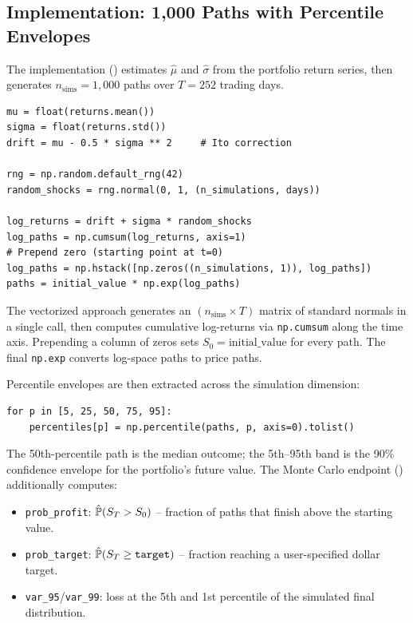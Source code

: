 \subsection{Implementation: 1,000 Paths with Percentile Envelopes}

The implementation () estimates $\hat{\mu}$ and $\hat{\sigma}$ from the portfolio return series, then generates $n_{\text{sims}} = 1{,}000$ paths over $T = 252$ trading days.

\begin{lstlisting}[style=python, caption={GBM vectorized simulation -- \filepath{portfolio\_engine.py} lines 304--319}]
mu = float(returns.mean())
sigma = float(returns.std())
drift = mu - 0.5 * sigma ** 2     # Ito correction

rng = np.random.default_rng(42)
random_shocks = rng.normal(0, 1, (n_simulations, days))

log_returns = drift + sigma * random_shocks
log_paths = np.cumsum(log_returns, axis=1)
# Prepend zero (starting point at t=0)
log_paths = np.hstack([np.zeros((n_simulations, 1)), log_paths])
paths = initial_value * np.exp(log_paths)
\end{lstlisting}

The vectorized approach generates an $(n_{\text{sims}} \times T)$ matrix of standard normals in a single call, then computes cumulative log-returns via \texttt{np.cumsum} along the time axis. Prepending a column of zeros sets $S_0 = \text{initial\_value}$ for every path. The final \texttt{np.exp} converts log-space paths to price paths.

Percentile envelopes are then extracted across the simulation dimension:

\begin{lstlisting}[style=python, caption={Percentile extraction -- \filepath{portfolio\_engine.py} lines 325--327}]
for p in [5, 25, 50, 75, 95]:
    percentiles[p] = np.percentile(paths, p, axis=0).tolist()
\end{lstlisting}

The 50th-percentile path is the median outcome; the 5th--95th band is the 90\% confidence envelope for the portfolio's future value. The Monte Carlo endpoint () additionally computes:

\begin{itemize}
  \item \texttt{prob\_profit}: $\hat{\operatorname{\mathbb{P}}}(S_T > S_0)$ -- fraction of paths that finish above the starting value.
  \item \texttt{prob\_target}: $\hat{\operatorname{\mathbb{P}}}(S_T \geq \texttt{target})$ -- fraction reaching a user-specified dollar target.
  \item \texttt{var\_95}/\texttt{var\_99}: loss at the 5th and 1st percentile of the simulated final distribution.
\end{itemize}

